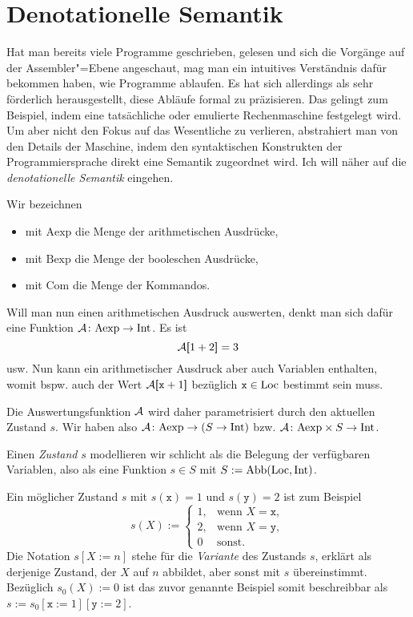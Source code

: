\section{Denotationelle Semantik}

Hat man bereits viele Programme geschrieben, gelesen und sich die Vorgänge
auf der Assembler"=Ebene angeschaut, mag man ein intuitives Verständnis
dafür bekommen haben, wie Programme ablaufen. Es hat sich allerdings
als sehr förderlich herausgestellt, diese Abläufe formal zu präzisieren.
Das gelingt zum Beispiel, indem eine tatsächliche oder emulierte
Rechenmaschine festgelegt wird. Um aber nicht den Fokus auf das
Wesentliche zu verlieren, abstrahiert man von den Details der Maschine,
indem den syntaktischen Konstrukten der Programmiersprache direkt eine
Semantik zugeordnet wird. Ich will näher auf die \emph{denotationelle
Semantik} eingehen.

Wir bezeichnen
\begin{itemize}[nosep]
\item mit $\mathrm{Aexp}$ die Menge der arithmetischen Ausdrücke,
\item mit $\mathrm{Bexp}$ die Menge der booleschen Ausdrücke,
\item mit $\mathrm{Com}$ die Menge der Kommandos.
\end{itemize}
Will man nun einen arithmetischen Ausdruck auswerten, denkt
man sich dafür eine Funktion $\mathcal A\colon\mathrm{Aexp}\to\mathrm{Int}$.
Es ist%
\[\mathcal A[\hspace{-2.6pt}[1+2]\hspace{-2.4pt}] = 3\]
usw. Nun kann ein arithmetischer Ausdruck aber auch Variablen enthalten,
womit bspw. auch der Wert $\mathcal A[\hspace{-2.6pt}[\texttt{x}+1]\hspace{-2.4pt}]$ bezüglich $\texttt{x}\in\mathrm{Loc}$
bestimmt sein muss.

Die Auswertungsfunktion $\mathcal A$ wird daher parametrisiert durch den aktuellen
Zustand $s$. Wir haben also $\mathcal A\colon\mathrm{Aexp}\to (S\to\mathrm{Int})$
bzw. $\mathcal A\colon\mathrm{Aexp}\times S\to\mathrm{Int}$.

Einen \emph{Zustand} $s$ modellieren wir schlicht als die Belegung
der verfügbaren Variablen, also als eine Funktion $s\in S$ mit
$S:=\operatorname{Abb}(\mathrm{Loc},\mathrm{Int})$.

Ein möglicher Zustand $s$ mit $s(\mathtt x)=1$ und $s(\mathtt y)=2$
ist zum Beispiel
\[s(X) := \begin{cases}
1, & \text{wenn $X=\mathtt x$},\\
2, & \text{wenn $X=\mathtt y$},\\
0 & \text{sonst}. 
\end{cases}\]
Die Notation $s[X:=n]$ stehe für die \emph{Variante} des Zustands $s$,
erklärt als derjenige Zustand, der $X$ auf $n$ abbildet, aber sonst
mit $s$ übereinstimmt. Bezüglich $s_0(X):=0$ ist das zuvor genannte
Beispiel somit beschreibbar als $s:=s_0[\mathtt x := 1][\mathtt y := 2]$.

